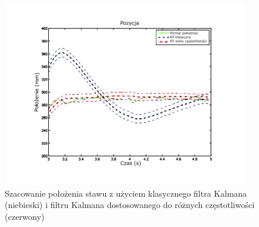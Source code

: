 \begin{figure}[!htp]
	\centering 
	\includegraphics[width=0.95\textwidth]{images/Fig03.png}	
	\caption{Szacowanie położenia stawu z użyciem klasycznego filtra Kalmana (niebieski) i filtru Kalmana dostosowanego do różnych częstotliwości (czerwony) \cite{Murray-Smith2014}}
	\label{fig:literature:feng}
\end{figure}

